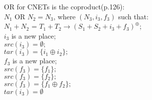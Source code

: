 OR for CNETs is the coproduct(p.126):\\
$N_1$ OR $N_2 = N_3$, where $(N_3,  i_3, f_3)$ such that:\\
$N_1 + N_2$ = $T_1 + T_2 \rightarrow (S_1 + S_2 + i_3 + f_3)^\oplus$;\\
$i_3$ is a new place;\\
$src(i_3) = \emptyset;$\\
$tar(i_3) =\{i_1 \oplus i_2\};$\\
$f_3$ is a new place;\\
$src(f_3) = \{f_1\};$\\
$src(f_3) = \{f_2\};$\\
$src(f_3) = \{f_1 \oplus f_2\};$\\
$tar(i_3) =\emptyset$\\
